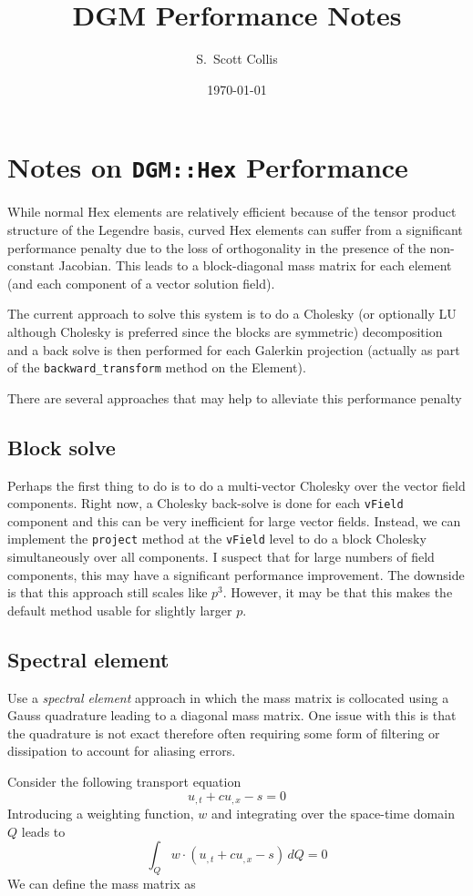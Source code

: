 \documentclass[11pt]{amsart}
\title{DGM Performance Notes}
\author{S.\ Scott Collis}
\date{\today}
\begin{document}
\maketitle

\section{Notes on \texttt{DGM::Hex} Performance}
While normal Hex elements are relatively efficient because of the tensor product structure of the Legendre basis, curved Hex elements can suffer from a significant performance penalty due to the loss of orthogonality in the presence of the non-constant Jacobian.  This leads to a block-diagonal mass matrix for each element (and each component of a vector solution field).

The current approach to solve this system is to do a Cholesky (or optionally LU although Cholesky is preferred since the blocks are symmetric) decomposition and a back solve is then performed for each Galerkin projection (actually as part of the \texttt{backward\_transform} method on the Element).

There are several approaches that may help to alleviate this performance penalty
\subsection{Block solve} 
Perhaps the first thing to do is to do a multi-vector Cholesky over the vector field components.  Right now, a Cholesky back-solve is done for each \texttt{vField} component and this can be very inefficient for large vector fields.  Instead, we can implement the \texttt{project} method at the \texttt{vField} level to do a block Cholesky simultaneously over all components.  I suspect that for large numbers of field components, this may have a significant performance improvement.  The downside is that this approach still scales like $p^3$.  However, it may be that this makes the default method usable for slightly larger $p$.
\subsection{Spectral element} 
Use a \emph{spectral element} approach in which the mass matrix is collocated using a Gauss quadrature leading to a diagonal mass matrix.  One issue with this is that the quadrature is not exact therefore often requiring some form of filtering or dissipation to account for aliasing errors.

Consider the following transport equation
\[ u_{,t} + c u_{,x} - s = 0 \]
Introducing a weighting function, $w$ and integrating over the space-time domain $Q$ leads to
\[ \int_Q w \cdot ( u_{,t} + c u_{,x} - s ) \, dQ = 0 \]
We can define the mass matrix as 
\end{document}
